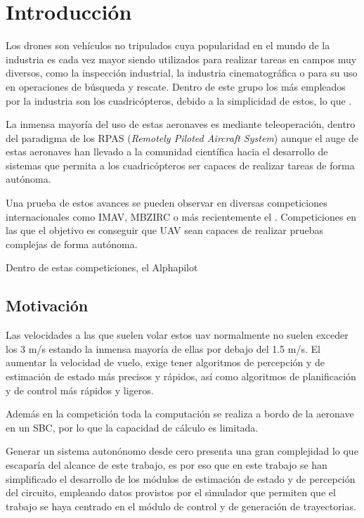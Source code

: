 \chapter{Introducción}
Los drones son vehículos no tripulados cuya popularidad en el mundo de la industria es cada vez mayor siendo utilizados para realizar tareas en campos muy diversos, como la inspección industrial, la industria cinematográfica o para su uso en operaciones de búsqueda y rescate. Dentro de este grupo los más empleados por la industria son los cuadricópteros, debido a la simplicidad de estos, lo que .

La inmensa mayoría del uso de estas aeronaves es mediante teleoperación, dentro del paradigma de los RPAS (\textit{Remotely Piloted Aircraft System}) aunque el auge de estas aeronaves han llevado a la comunidad científica hacia el desarrollo de sistemas que permita a los cuadricópteros ser capaces de realizar tareas de forma autónoma.

Una prueba de estos avances se pueden observar en diversas competiciones internacionales como IMAV, MBZIRC o más recientemente el . Competiciones en las que el objetivo es conseguir que UAV sean capaces de realizar pruebas complejas de forma autónoma.



Dentro de estas competiciones, el Alphapilot 


\section{Motivación}

Las velocidades a las que suelen volar estos uav normalmente no suelen exceder los 3 m/s estando la inmensa mayoría de ellas por debajo del 1.5 m/s. El aumentar la velocidad de vuelo, exige tener algoritmos de percepción y de estimación de estado más precisos y rápidos, así como algoritmos de planificación y de control más rápidos y ligeros.

Además en la competición toda la computación se realiza a bordo de la aeronave en un SBC, por lo que la capacidad de cálculo es limitada.

Generar un sistema autonónomo desde cero presenta una gran complejidad lo que escaparía del alcance de este trabajo, es por eso que en este trabajo se han simplificado el desarrollo de los módulos de estimación de estado y de percepción del circuito, empleando datos provistos por el simulador que permiten que el trabajo se haya centrado en el módulo de control y de generación de trayectorias.

